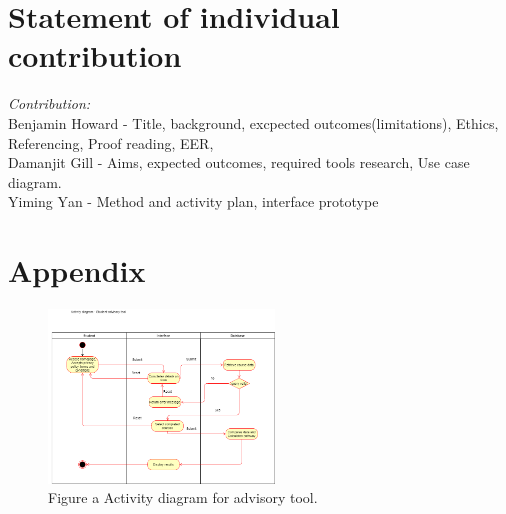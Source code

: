 \documentclass[12pt]{article}
\begin{document}
\newpage



\section*{Statement of individual contribution}
\emph{Contribution:}\\
Benjamin \textsc Howard - Title, background, excpected outcomes(limitations), Ethics, Referencing, Proof reading, EER,   \\ %
Damanjit \textsc Gill - Aims, expected outcomes, required tools research, Use case diagram.\\ %
Yiming \textsc Yan -  Method and activity plan, interface prototype\\%



\section*{Appendix}
\begin{figure}[h]
\centering
\includegraphics[width=6cm]{./ActivityDiagram.png}\\
Figure a Activity diagram for advisory tool.
\end{figure}



\begin{figure}[h]
\centering
\label{fig:comms}
\end{figure}
\end{document}

